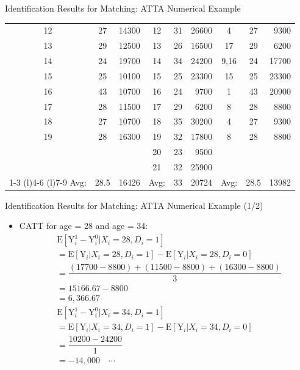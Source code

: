 \documentclass[dvipsnames,hyperref={pdfpagelabels=false}]{beamer}
\begin{document}
\begin{frame}{Identification Results for Matching: ATT}{A Numerical Example}
\begin{center}
{\begin{threeparttable}
\begin{tabular}{@{} ccrccrccr @{}}
					12 & 27 & 14300 & 12 & 31 & 26600 &  4 & 27 & 9300   \\
					13 & 29 & 12500 & 13 & 26 & 16500 & 17 & 29 & 6200   \\
					14 & 24 & 19700 & 14 & 34 & 24200 & 9,16 & 24 & 17700  \\
					15 & 25 & 10100 & 15 & 25 & 23300 & 15 & 25 & 23300  \\
					16 & 43 & 10700 & 16 & 24 & 9700  &  1 & 43 & 20900  \\ 
					17 & 28 & 11500 & 17 & 29 & 6200  &  8 & 28 & 8800   \\ 
					18 & 27 & 10700 & 18 & 35 & 30200 &  4 & 27 & 9300   \\
					19 & 28 & 16300 & 19 & 32 & 17800 &  8 & 28 & 8800  \\ 
					&    &       & 20 & 23 & 9500  &    &  &   \\
					&    &       & 21 & 32 & 25900 &    &  &   \\ 
					\cmidrule(l){1-3}  \cmidrule(l){4-6} \cmidrule(l){7-9} 
					Avg: & 28.5 & 16426 & Avg: & 33 & 20724 & Avg: & 28.5 & 13982 \\
				\end{tabular}
		\end{threeparttable}}
	\end{center}
\end{frame}





\begin{frame}{Identification Results for Matching: ATT}{A Numerical Example (1/2)}
\begin{itemize}
    \item CATT for age = 28 and age = 34:
    \vspace{0.2cm}
    \begin{equation*}
        \begin{aligned}
            & \mathrm{E}[\mathrm{Y}^{1}_{i}-\mathrm{Y}^{0}_{i}|X_{i}=28, D_{i}=1] \\
            &= \mathrm{E}[\mathrm{Y}_{i}|X_{i}=28, D_{i}=1] - \mathrm{E}[\mathrm{Y}_{i}|X_{i}=28, D_{i}=0] \\
            &= \dfrac{(17700-8800)+(11500-8800)+(16300-8800)}{3} \\
            &= 15166.67 - 8800 \\
            &= 6{,}366.67 \\[10pt]
            & \mathrm{E}[\mathrm{Y}^{1}_{i}-\mathrm{Y}^{0}_{i}|X_{i}=34, D_{i}=1] \\
            &= \mathrm{E}[\mathrm{Y}_{i}|X_{i}=34, D_{i}=1] - \mathrm{E}[\mathrm{Y}_{i}|X_{i}=34, D_{i}=0] \\
            &= \dfrac{10200-24200}{1} \\
            &= -14{,}000 \quad \cdots
        \end{aligned}
    \end{equation*}
\end{itemize}
\end{frame}
\end{document}
